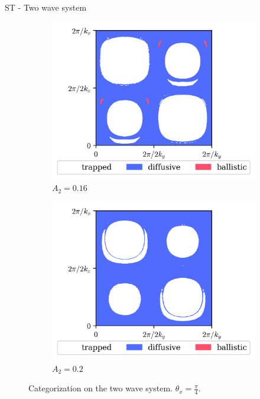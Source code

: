 \documentclass[10pt]{beamer}
\begin{document}
\begin{frame}{ST - Two wave system}
    \begin{figure}
        \begin{subfigure}[b]{0.45\textwidth}
            \includegraphics[width=\textwidth]{graf_2ondas/000.1600_000.7854.png}
            \caption{$A_2 = 0.16$}
        \end{subfigure}
        \begin{subfigure}[b]{0.45\textwidth}
            \includegraphics[width=\textwidth]{graf_2ondas/000.2100_000.7854.png}
            \caption{$A_2 = 0.2$}
        \end{subfigure}
        \caption{Categorization on the two wave system. $\theta_x = \frac{\pi}{4}$.}
    \end{figure}
\end{frame}
\end{document}
